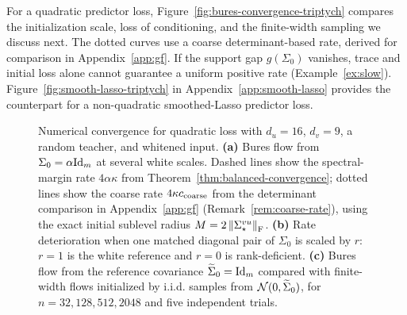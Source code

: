 For a quadratic predictor loss, Figure~\ref{fig:bures-convergence-triptych} compares the initialization scale, loss of conditioning, and the finite-width sampling we discuss next. The dotted curves use a coarse determinant-based rate, derived for comparison in Appendix~\ref{app:gf}.
If the support gap $g(\Sigma_0)$ vanishes, trace and initial loss alone cannot guarantee a uniform positive rate (Example~\ref{ex:slow}).
Figure~\ref{fig:smooth-lasso-triptych} in Appendix~\ref{app:smooth-lasso} provides the counterpart for a non-quadratic smoothed-Lasso predictor loss.

\begin{figure}[t]
    \centering
    \resizebox{\linewidth}{!}{}
    \captionsetup{font=footnotesize,skip=2pt}
    \caption{
      Numerical convergence for quadratic loss with $d_u=16$, $d_v=9$, a random teacher, and whitened input.
      \textbf{(a)} Bures flow from $\Sigma_0=\alpha\mathrm{Id}_m$ at several white scales. Dashed lines show the spectral-margin rate $4\alpha\kappa$ from Theorem~\ref{thm:balanced-convergence}; dotted lines show the coarse rate $4\kappa c_{\rm coarse}$ from the determinant comparison in Appendix~\ref{app:gf} (Remark~\ref{rem:coarse-rate}), using the exact initial sublevel radius $M=2\left\lVert \Sigma^{vu}_\star \right\rVert_{\mathrm{F}}$.
      \textbf{(b)} Rate deterioration when one matched diagonal pair of $\Sigma_0$ is scaled by $r$: $r=1$ is the white reference and $r=0$ is rank-deficient.
      \textbf{(c)} Bures flow from the reference covariance $\widetilde\Sigma_0=\mathrm{Id}_m$ compared with finite-width flows initialized by i.i.d. samples from $\mathcal N(0,\widetilde\Sigma_0)$, for $n=32,128,512,2048$ and five independent trials.
    }
    \label{fig:bures-convergence-triptych}
    \label{fig:bures-scale-sweep}
    \label{fig:perturb-scale-sweep}
    \label{fig:bures-finite-width-comparison}
    \vspace{-1.5em}
\end{figure}

